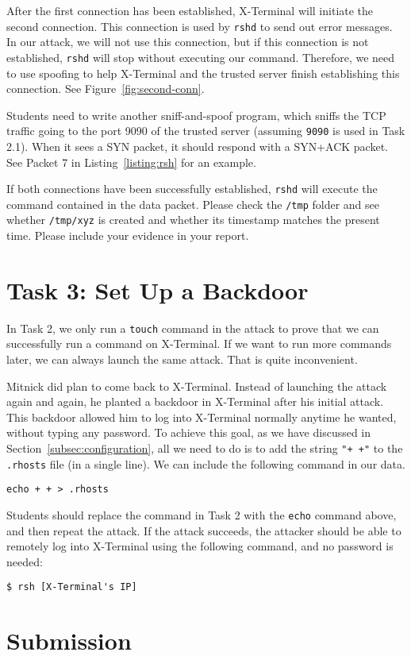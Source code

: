 After the first connection has been established, X-Terminal will initiate 
the second connection. This connection is used by \texttt{rshd} to send 
out error messages. In our attack, we will not use this connection, but
if this connection is not established, \texttt{rshd} will stop without 
executing our command. Therefore, we need to use spoofing 
to help X-Terminal and the trusted server finish establishing this connection. 
See Figure~\ref{fig:second-conn}. 


Students need to write another sniff-and-spoof program, which
sniffs the TCP traffic going to the port 9090 of the trusted server (assuming
\texttt{9090} is used in Task 2.1). When it sees a SYN packet,
it should respond with a SYN+ACK packet. See Packet 7 
in Listing~\ref{listing:rsh} for an example.

If both connections have been successfully established, \texttt{rshd} 
will execute the command contained in the \rsh data packet. Please 
check the \texttt{/tmp} folder and see whether \texttt{/tmp/xyz} is created
and whether its timestamp matches the present time. Please 
include your evidence in your report. 



\section{Task 3: Set Up a Backdoor}

In Task 2, we only run a \texttt{touch} command in the attack to prove that we can
successfully run a command on X-Terminal. If we want to run
more commands later, we can always launch the same attack. That is quite inconvenient. 

Mitnick did plan to come back to X-Terminal. Instead of launching the attack
again and again, he planted a backdoor in X-Terminal after his initial attack. 
This backdoor allowed him to log into X-Terminal normally anytime he wanted, without 
typing any password. 
To achieve this goal, as we have discussed in 
Section~\ref{subsec:configuration}, 
all we need to do is to add the string \texttt{"+ +"} to
the \texttt{.rhosts} file (in a single line). We can
include the following command in our \rsh data.

\begin{lstlisting}
echo + + > .rhosts
\end{lstlisting}

Students should replace the \rsh command in Task 2 with
the \texttt{echo} command above, and then repeat the attack.   
If the attack succeeds, the attacker should be able to 
remotely log into X-Terminal using the following command,
and no password is needed: 

\begin{lstlisting}
$ rsh [X-Terminal's IP]
\end{lstlisting}



\section{Submission}

\seedsubmission








